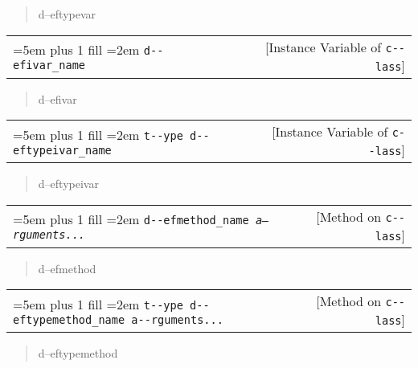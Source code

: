 \documentclass{book}
\begin{document}
\begin{titlepage}
%
\begin{quote}
\unskip{\parskip=0pt\noindent}%
d--eftypevar
\end{quote}


\noindent\begin{tabularx}{\linewidth}{@{}Xr}
\rightskip=5em plus 1 fill
\hangindent=2em
\texttt{d{-}{-}efivar\_name}& [Instance Variable of \texttt{c{-}{-}lass}]
\end{tabularx}

%
\begin{quote}
\unskip{\parskip=0pt\noindent}%
d--efivar
\end{quote}


\noindent\begin{tabularx}{\linewidth}{@{}Xr}
\rightskip=5em plus 1 fill
\hangindent=2em
\texttt{t{-}{-}ype d{-}{-}eftypeivar\_name}& [Instance Variable of \texttt{c{-}{-}lass}]
\end{tabularx}

%
\begin{quote}
\unskip{\parskip=0pt\noindent}%
d--eftypeivar
\end{quote}


\noindent\begin{tabularx}{\linewidth}{@{}Xr}
\rightskip=5em plus 1 fill
\hangindent=2em
\texttt{d{-}{-}efmethod\_name \EmbracOn{}\textnormal{\textsl{a--rguments...}}\EmbracOff{}}& [Method on \texttt{c{-}{-}lass}]
\end{tabularx}

%
\begin{quote}
\unskip{\parskip=0pt\noindent}%
d--efmethod
\end{quote}


\noindent\begin{tabularx}{\linewidth}{@{}Xr}
\rightskip=5em plus 1 fill
\hangindent=2em
\texttt{t{-}{-}ype d{-}{-}eftypemethod\_name a{-}{-}rguments...}& [Method on \texttt{c{-}{-}lass}]
\end{tabularx}

%
\begin{quote}
\unskip{\parskip=0pt\noindent}%
d--eftypemethod
\end{quote}




\end{titlepage}
\end{document}

